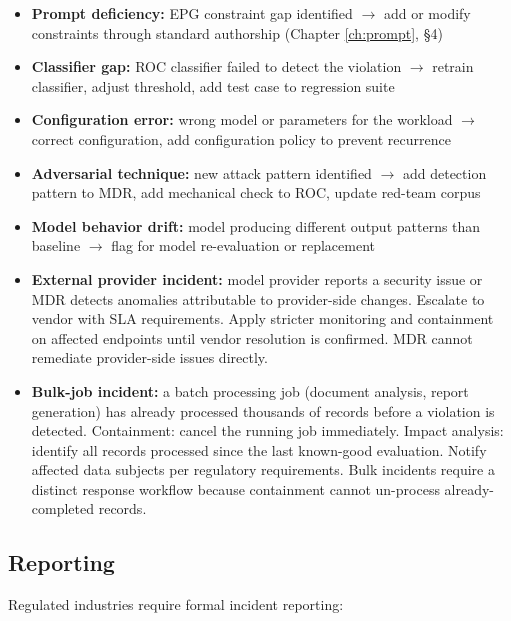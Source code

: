 \begin{itemize}
  \item \textbf{Prompt deficiency:} EPG constraint gap identified $\to$ add or modify constraints through standard authorship (Chapter \ref{ch:prompt}, \S{}4)
  \item \textbf{Classifier gap:} ROC classifier failed to detect the violation $\to$ retrain classifier, adjust threshold, add test case to regression suite
  \item \textbf{Configuration error:} wrong model or parameters for the workload $\to$ correct configuration, add configuration policy to prevent recurrence
  \item \textbf{Adversarial technique:} new attack pattern identified $\to$ add detection pattern to MDR, add mechanical check to ROC, update red-team corpus
  \item \textbf{Model behavior drift:} model producing different output patterns than baseline $\to$ flag for model re-evaluation or replacement
  \item \textbf{External provider incident:} model provider reports a security issue or MDR detects anomalies attributable to provider-side changes. Escalate to vendor with SLA requirements. Apply stricter monitoring and containment on affected endpoints until vendor resolution is confirmed. MDR cannot remediate provider-side issues directly.
  \item \textbf{Bulk-job incident:} a batch processing job (document analysis, report generation) has already processed thousands of records before a violation is detected. Containment: cancel the running job immediately. Impact analysis: identify all records processed since the last known-good evaluation. Notify affected data subjects per regulatory requirements. Bulk incidents require a distinct response workflow because containment cannot un-process already-completed records.
\end{itemize}


\subsection{Reporting}


Regulated industries require formal incident reporting:

